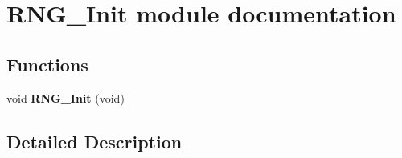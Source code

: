 \hypertarget{group___r_n_g___init__module}{}\section{R\+N\+G\+\_\+\+Init module documentation}
\label{group___r_n_g___init__module}
\subsection*{Functions}
\begin{DoxyCompactItemize}
\item 
void {\bfseries R\+N\+G\+\_\+\+Init} (void)\hypertarget{group___r_n_g___init__module_gab774557a4dbbd02ae4ce1b218a3967a4}{}\label{group___r_n_g___init__module_gab774557a4dbbd02ae4ce1b218a3967a4}

\end{DoxyCompactItemize}


\subsection{Detailed Description}
